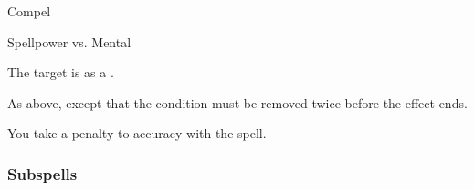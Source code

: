 \newpage
\begin{spellsection}{Compel}

\begin{spellheader}
\end{spellheader}

\begin{spellcontent}

\begin{spelltargetinginfo}




\end{spelltargetinginfo}


\begin{spelleffects}




\begin{spellattack}{Spellpower vs. Mental}


\hit The target is \immobilized as a .


\crit
As above, except that the condition must be removed twice before the effect ends.



\end{spellattack}





\end{spelleffects}

\end{spellcontent}
\begin{spellfooter}


\end{spellfooter}
\begin{spellsubcontent}


\begin{spellcantrip}

You take a  penalty to accuracy with the spell.

\end{spellcantrip}


\end{spellsubcontent}
\end{spellsection}


\subsubsection{Subspells}


